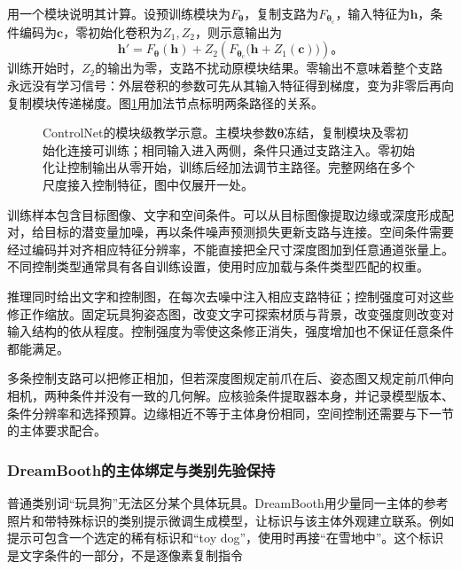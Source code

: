 用一个模块说明其计算。设预训练模块为$F_{\bm{\theta}}$，复制支路为$F_{\bm{\theta}_{\mathrm{c}}}$，输入特征为$\bm{h}$，条件编码为$\bm{c}$，零初始化卷积为$Z_1,Z_2$，则示意输出为
\begin{equation}
 \bm{h}'=F_{\bm{\theta}}(\bm{h})+
 Z_2\!\left(F_{\bm{\theta}_{\mathrm{c}}}
       \bigl(\bm{h}+Z_1(\bm{c})\bigr)\right)\text{。}
 \label{eq:vision-controlnet}
\end{equation}
训练开始时，$Z_2$的输出为零，支路不扰动原模块结果。零输出不意味着整个支路永远没有学习信号：外层卷积的参数可先从其输入特征得到梯度，变为非零后再向复制模块传递梯度。图\ref{fig:vision-controlnet}用加法节点标明两条路径的关系。

\begin{figure}[htbp]
 \centering
 
 \caption{ControlNet的模块级教学示意。主模块参数$\bm{\theta}$冻结，复制模块及零初始化连接可训练；相同输入进入两侧，条件只通过支路注入。零初始化让控制输出从零开始，训练后经加法调节主路径。完整网络在多个尺度接入控制特征，图中仅展开一处。}
 \label{fig:vision-controlnet}
\end{figure}

训练样本包含目标图像、文字和空间条件。可以从目标图像提取边缘或深度形成配对，给目标的潜变量加噪，再以条件噪声预测损失更新支路与连接。空间条件需要经过编码并对齐相应特征分辨率，不能直接把全尺寸深度图加到任意通道张量上。不同控制类型通常具有各自训练设置，使用时应加载与条件类型匹配的权重。

推理同时给出文字和控制图，在每次去噪中注入相应支路特征；控制强度可对这些修正作缩放。固定玩具狗姿态图，改变文字可探索材质与背景，改变强度则改变对输入结构的依从程度。控制强度为零使这条修正消失，强度增加也不保证任意条件都能满足。

多条控制支路可以把修正相加，但若深度图规定前爪在后、姿态图又规定前爪伸向相机，两种条件并没有一致的几何解。应核验条件提取器本身，并记录模型版本、条件分辨率和选择预算。边缘相近不等于主体身份相同，空间控制还需要与下一节的主体要求配合。

\subsubsection{DreamBooth的主体绑定与类别先验保持}
\label{sec:vision-generation-dreambooth}

普通类别词“玩具狗”无法区分某个具体玩具。DreamBooth用少量同一主体的参考照片和带特殊标识的类别提示微调生成模型，让标识与该主体外观建立联系。例如提示可包含一个选定的稀有标识和“toy dog”，使用时再接“在雪地中”。这个标识是文字条件的一部分，不是逐像素复制指令

